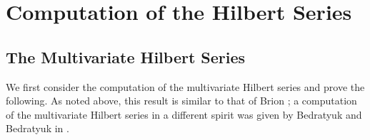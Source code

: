 \documentclass{amsart}
\theoremstyle{definition}
\theoremstyle{remark}
\begin{document}
\section{Computation of the Hilbert Series}
\label{sec:HilbSer}


\subsection{The Multivariate Hilbert Series}
\label{subsec:HilbSerMultivar}

We first consider the computation of the multivariate Hilbert series and prove the following.
As noted above, this result is similar to that of Brion
\cite[Th\'{e}or\`{e}me 1]{Brion};
a computation of the multivariate Hilbert series in a different spirit was given by Bedratyuk and
Bedratyuk in \cite[Theorem 3]{BedratyukBedratyukMultivarPoincare}.
\end{document}
